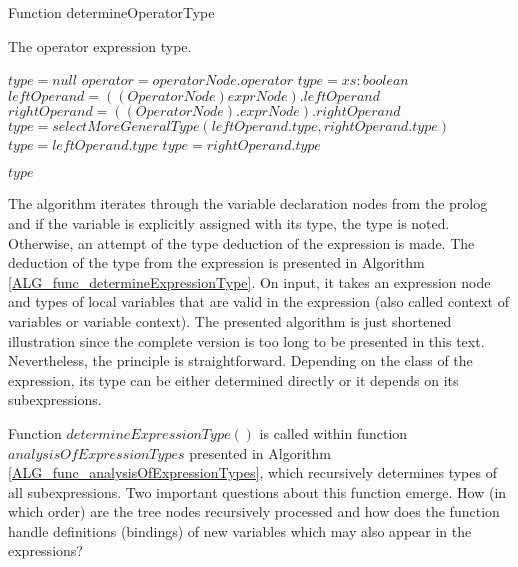 \begin{algorithm}
\caption{Function determineOperatorType}
\label{ALG_func_determineOperatorType}
\begin{algorithmic}[1]
\ENSURE The operator expression type.

\STATE $type = null$
\STATE $operator = operatorNode.operator$
    \STATE $type = xs:boolean$
    \STATE $leftOperand = ((OperatorNode)exprNode).leftOperand$
    \STATE $rightOperand = ((OperatorNode).exprNode).rightOperand$
        \STATE $type = selectMoreGeneralType(leftOperand.type, rightOperand.type)$
        \STATE $type = leftOperand.type$
        \STATE $type = rightOperand.type$
    \ENDIF
\ENDIF

\RETURN $type$
\end{algorithmic}
\end{algorithm}

The algorithm iterates through the variable declaration nodes from the prolog and if the variable is explicitly assigned with its type, the type is noted. Otherwise, an attempt of the type deduction of the expression is made. The deduction of the type from the expression is presented in Algorithm \ref{ALG_func_determineExpressionType}. On input, it takes an expression node and types of local variables that are valid in the expression (also called context of variables or variable context). The presented algorithm is just shortened illustration since the complete version is too long to be presented in this text. Nevertheless, the principle is straightforward. Depending on the class of the expression, its type can be either determined directly or it depends on its subexpressions. 

Function $determineExpressionType()$ is called within function $analysisOfExpressionTypes$ presented in Algorithm \ref{ALG_func_analysisOfExpressionTypes}, which recursively determines types of all subexpressions. Two important questions about this function emerge. How (in which order) are the tree nodes recursively processed and how does the function handle definitions (bindings) of new variables which may also appear in the expressions?

